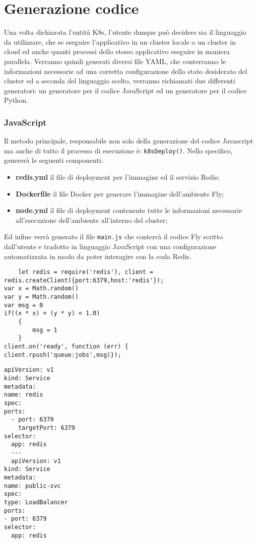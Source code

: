 \section{Generazione codice}
Una volta dichiarata l'entità K8s, l'utente dunque può decidere sia il linguaggio da utilizzare, che se eseguire l'applicativo in un cluster locale o un cluster in cloud ed anche quanti processi dello stesso applicativo eseguire in maniera parallela. Verranno quindi generati diversi file YAML, che conterranno le informazioni necessarie ad una corretta configurazione dello stato desiderato del cluster ed a seconda del linguaggio scelto, 
verranno richiamati due differenti generatori: un generatore per il codice JavaScript ed un generatore per il codice Python.

\subsubsection{JavaScript}
Il metodo principale, responsabile non solo della generazione del codice Javascript ma anche di tutto il processo di esecuzione è: \verb|k8sDeploy()|. 
Nello specifico, genererà le seguenti componenti:

\begin{itemize}
  \item\textbf{redis.yml} il file di deployment per l'immagine ed il servizio Redis;
  \item\textbf{Dockerfile} il file Docker per generare l'immagine dell'ambiente Fly;
  \item\textbf{node.yml} il file di deployment contenente tutte le informazioni necessarie all'esecuzione dell'ambiente all'interno del cluster;
\end{itemize}

Ed infine verrà generato il file \verb|main.js| che conterrà il codice Fly scritto dall'utente e tradotto in linguaggio JavaScript con una configurazione automatizzata in modo da poter interagire con la coda Redis.

\begin{lstlisting}
    let redis = require('redis'), client = redis.createClient({port:6379,host:'redis'});
var x = Math.random()
var y = Math.random()
var msg = 0
if((x * x) + (y * y) < 1.0)
    {
        msg = 1 
    }
client.on('ready', function (err) {
client.rpush('queue:jobs',msg)});
\end{lstlisting}


\begin{lstlisting}[language=FLY,caption={File di configurazione per il servizio Redis}, label={lst:k8s}]
  apiVersion: v1
kind: Service
metadata:
name: redis
spec:
ports:
  - port: 6379
    targetPort: 6379
selector:
  app: redis
  ---
  apiVersion: v1
kind: Service
metadata:
name: public-svc
spec:
type: LoadBalancer
ports:
- port: 6379
selector:
  app: redis

\end{lstlisting}

